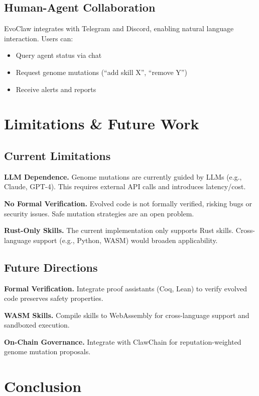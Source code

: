 \documentclass{article}
\begin{document}
\subsection{Human-Agent Collaboration}

EvoClaw integrates with Telegram and Discord, enabling natural language interaction. Users can:
\begin{itemize}
    \item Query agent status via chat
    \item Request genome mutations (``add skill X'', ``remove Y'')
    \item Receive alerts and reports
\end{itemize}

\section{Limitations \& Future Work}\label{sec:limitations}

\subsection{Current Limitations}

\textbf{LLM Dependence.} Genome mutations are currently guided by LLMs (e.g., Claude, GPT-4). This requires external API calls and introduces latency/cost.

\textbf{No Formal Verification.} Evolved code is not formally verified, risking bugs or security issues. Safe mutation strategies are an open problem.

\textbf{Rust-Only Skills.} The current implementation only supports Rust skills. Cross-language support (e.g., Python, WASM) would broaden applicability.

\subsection{Future Directions}

\textbf{Formal Verification.} Integrate proof assistants (Coq, Lean) to verify evolved code preserves safety properties.

\textbf{WASM Skills.} Compile skills to WebAssembly for cross-language support and sandboxed execution.

\textbf{On-Chain Governance.} Integrate with ClawChain \cite{clawchain} for reputation-weighted genome mutation proposals.

\section{Conclusion}\label{sec:conclusion}
\end{document}
